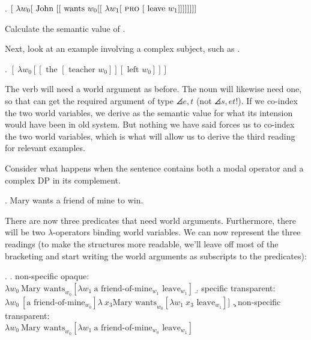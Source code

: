 \ex. $[\ \lambda w_{0} [ \mbox{ John } [ [ \mbox{ wants } w_{0} [ [\ \lambda w_{1} [ \mbox{ \textsc{pro} } [ \mbox{ leave } w_{1} ]]]]]]]]$
 
\begin{exercise}
	Calculate the semantic value of \Last. \eex
\end{exercise}

Next, look at an example involving a complex subject, such as .

\ex. $[\ \lambda w_{0} [ [ \mbox{ the } [ \mbox{ teacher } w_{0} ]] [ \mbox{ left } w_{0} ]]]$

The verb will need a world argument as before. The noun  will likewise need one, so that  can get the required argument of type $\angles{e,t}$ (not $\angles{s,et}$!). If we co-index the two world variables, we derive as the semantic value for \Last what its intension would have been in old system. But nothing we have said forces us to co-index the two world variables, which is what will allow us to derive the third reading for relevant examples.

Consider what happens when the sentence contains both a modal operator and a complex DP in its complement.

\ex. \label{fom} Mary wants a friend of mine to win.

There are now three predicates that need world arguments. Furthermore, there will be two $\lambda$-operators binding world variables. We can now represent the three readings (to make the structures more readable, we'll leave off most of the bracketing and start writing the world arguments as subscripts to the predicates):

\ex. \a. non-specific opaque:\\
$\lambda w_{0}\ \mbox{Mary wants}_{w_{0}} [ \lambda w_{1}\ \mbox{a friend-of-mine}_{w_{1}} \mbox{ leave}_{w_{1}} ]$ 
\b. specific transparent:\\
$\lambda w_{0}\ [ \mbox{a friend-of-mine}_{w_{0}} ] \lambda\ x_{3} \mbox{Mary wants}_{w_{0}} [ \lambda w_{1}\ x_{3} \mbox{ leave}_{w_{1}} ]]$ 
\c. non-specific transparent:\\
$\lambda w_{0}\ \mbox{Mary wants}_{w_{0}} [ \lambda w_{1}\ \mbox{a friend-of-mine}_{w_{0}} \mbox{ leave}_{w_{1}} ]$

